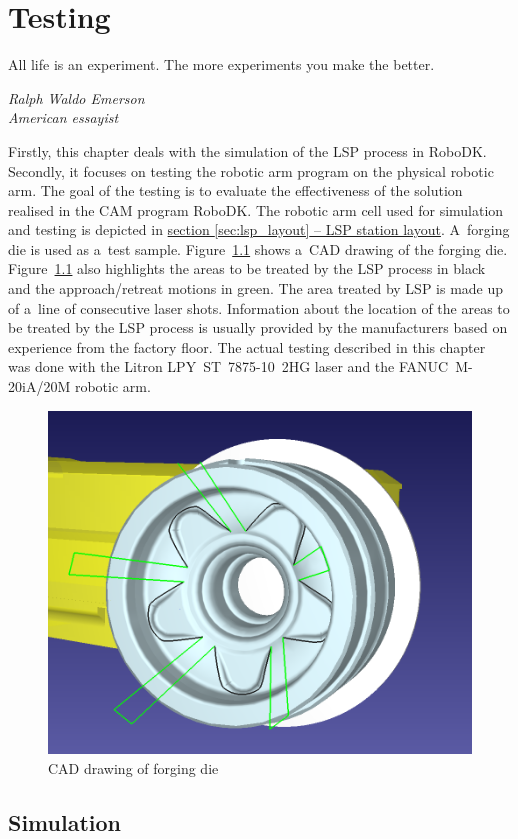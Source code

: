 \chapter{Testing \label{chap:testing}}

\label{chap:testing}

\epigraph{All life is an experiment. The more experiments you make the better.}{\textit{Ralph Waldo Emerson \\ American essayist }}

Firstly, this chapter deals with the simulation of the LSP process in RoboDK. Secondly, it focuses on testing the robotic arm program on the physical robotic arm. The goal of the testing is to evaluate the effectiveness of the solution realised in the CAM program RoboDK. The robotic arm cell used for simulation and testing is depicted in \hyperref[sec:lsp_layout]{section \ref{sec:lsp_layout} -- LSP station layout}. A~forging die is used as a~test sample. Figure~\ref{fig:cad} shows a~CAD drawing of the forging die. Figure~\ref{fig:cad} also highlights the areas to be treated by the LSP process in black and the approach/retreat motions in green. The area treated by LSP is made up of a~line of consecutive laser shots. Information about the location of the areas to be treated by the LSP process is usually provided by the manufacturers based on experience from the factory floor. The actual testing described in this chapter was done with the Litron LPY~ST~7875-10~2HG laser and the FANUC~M-20iA/20M robotic arm. 

\begin{figure}[H]
    \centering
    \includegraphics[width=0.5\linewidth]{img/cad.PNG}
    \caption{CAD drawing of forging die}
    \label{fig:cad}
\end{figure}

\section{Simulation}

